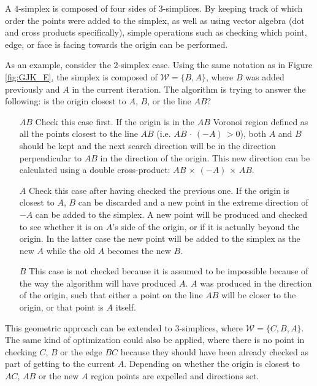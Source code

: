 A $4$-simplex is composed of four sides of $3$-simplices. By keeping track of which order the points were added to the simplex, as well as using vector algebra (dot and cross products specifically), simple operations such as checking which point, edge, or face is facing towards the origin can be performed.

As an example, consider the $2$-simplex case. Using the same notation as in Figure \ref{fig:GJK_E}, the simplex is composed of $\mathcal{W} = \{B,A\}$, where $B$ was added previously and $A$ in the current iteration. The algorithm is trying to answer the following: is the origin closest to $A$, $B$, or the line $AB$? 

\begin{enumerate}
	\item[$AB$] Check this case first. If the origin is in the $AB$ Voronoi region defined as all the points closest to the line $AB$ (i.e. $AB\,\cdot \,(-A)\,>0$), both $A$ and $B$ should be kept and the next search direction will be in the direction perpendicular to $AB$ in the direction of the origin. This new direction can be calculated using a double cross-product: $AB\, \times \,(-A)\,\times\, AB$.
	\item[$A$] Check this case after having checked the previous one. If the origin is closest to $A$, $B$ can be discarded and a new point in the extreme direction of $-A$ can be added to the simplex.  A new point will be produced and checked to see whether it is on $A$'s side of the origin, or if it is actually beyond the origin. In the latter case the new point will be added to the simplex as the new $A$ while the old $A$ becomes the new $B$.
	\item[$B$] This case is not checked because it is assumed to be impossible because of the way the algorithm will have produced $A$. $A$ was produced in the direction of the origin, such that either a point on the line $AB$ will be closer to the origin, or that point is $A$ itself. 
\end{enumerate}

This geometric approach can be extended to $3$-simplices, where $\mathcal{W} = \{C, B, A\}$. The same kind of optimization could also be applied, where there is no point in checking $C$, $B$ or the edge $BC$ because they should have been already checked as part of getting to the current $A$. Depending on whether the origin is closest to $AC$, $AB$ or the new $A$ region points are expelled and directions set.


